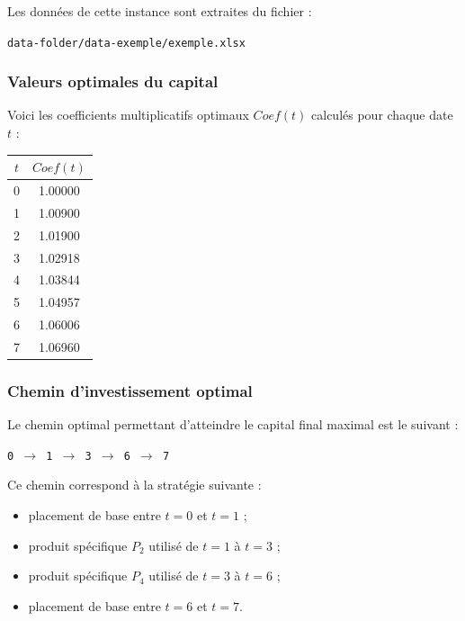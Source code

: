 \documentclass[a4paper,11pt]{article}
\begin{document}
Les données de cette instance sont extraites du fichier :

\begin{center}
	\texttt{data-folder/data-exemple/exemple.xlsx}
\end{center}

\vspace{0.3cm}

\subsubsection{Valeurs optimales du capital}

Voici les coefficients multiplicatifs optimaux $Coef(t)$ calculés pour chaque date $t$ :

\begin{center}
	\begin{tabular}{|c|c|}
		\hline
		$t$ & $Coef(t)$ \\
		\hline
		0   & 1.00000   \\
		1   & 1.00900   \\
		2   & 1.01900   \\
		3   & 1.02918   \\
		4   & 1.03844   \\
		5   & 1.04957   \\
		6   & 1.06006   \\
		7   & 1.06960   \\
		\hline
	\end{tabular}
\end{center}

\vspace{0.4cm}

\subsubsection{Chemin d’investissement optimal}

Le chemin optimal permettant d’atteindre le capital final maximal est le suivant :

\begin{center}
	\texttt{0 $\rightarrow$ 1 $\rightarrow$ 3 $\rightarrow$ 6 $\rightarrow$ 7}
\end{center}

Ce chemin correspond à la stratégie suivante :
\begin{itemize}
	\item placement de base entre $t = 0$ et $t = 1$ ;
	\item produit spécifique $P_2$ utilisé de $t = 1$ à $t = 3$ ;
	\item produit spécifique $P_4$ utilisé de $t = 3$ à $t = 6$ ;
	\item placement de base entre $t = 6$ et $t = 7$.
\end{itemize}
\end{document}
